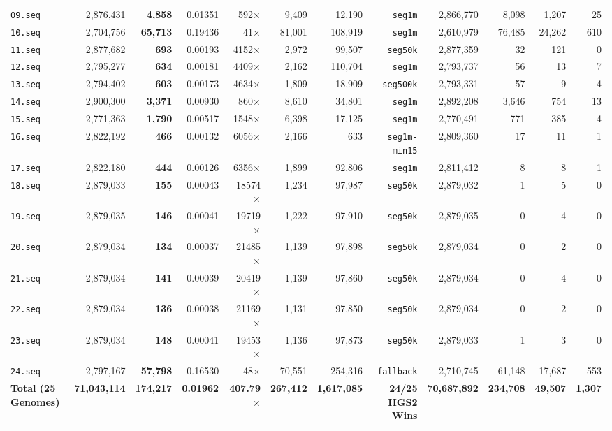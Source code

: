 \documentclass[10pt]{article}
\theoremstyle{definition}
\begin{document}
\begin{table}[h!]
{\begin{tabular}{lrrrrrrrrrrr}
\texttt{09.seq} & 2,876,431 & \textbf{4,858} & 0.01351 & 592$\times$ & 9,409 & 12,190 & \texttt{seg1m} & 2,866,770 & 8,098 & 1,207 & 25 \\
\texttt{10.seq} & 2,704,756 & \textbf{65,713} & 0.19436 & 41$\times$ & 81,001 & 108,919 & \texttt{seg1m} & 2,610,979 & 76,485 & 24,262 & 610 \\
\texttt{11.seq} & 2,877,682 & \textbf{693} & 0.00193 & 4152$\times$ & 2,972 & 99,507 & \texttt{seg50k} & 2,877,359 & 32 & 121 & 0 \\
\texttt{12.seq} & 2,795,277 & \textbf{634} & 0.00181 & 4409$\times$ & 2,162 & 110,704 & \texttt{seg1m} & 2,793,737 & 56 & 13 & 7 \\
\texttt{13.seq} & 2,794,402 & \textbf{603} & 0.00173 & 4634$\times$ & 1,809 & 18,909 & \texttt{seg500k} & 2,793,331 & 57 & 9 & 4 \\
\texttt{14.seq} & 2,900,300 & \textbf{3,371} & 0.00930 & 860$\times$ & 8,610 & 34,801 & \texttt{seg1m} & 2,892,208 & 3,646 & 754 & 13 \\
\texttt{15.seq} & 2,771,363 & \textbf{1,790} & 0.00517 & 1548$\times$ & 6,398 & 17,125 & \texttt{seg1m} & 2,770,491 & 771 & 385 & 4 \\
\texttt{16.seq} & 2,822,192 & \textbf{466} & 0.00132 & 6056$\times$ & 2,166 & 633 & \texttt{seg1m-min15} & 2,809,360 & 17 & 11 & 1 \\
\texttt{17.seq} & 2,822,180 & \textbf{444} & 0.00126 & 6356$\times$ & 1,899 & 92,806 & \texttt{seg1m} & 2,811,412 & 8 & 8 & 1 \\
\texttt{18.seq} & 2,879,033 & \textbf{155} & 0.00043 & 18574$\times$ & 1,234 & 97,987 & \texttt{seg50k} & 2,879,032 & 1 & 5 & 0 \\
\texttt{19.seq} & 2,879,035 & \textbf{146} & 0.00041 & 19719$\times$ & 1,222 & 97,910 & \texttt{seg50k} & 2,879,035 & 0 & 4 & 0 \\
\texttt{20.seq} & 2,879,034 & \textbf{134} & 0.00037 & 21485$\times$ & 1,139 & 97,898 & \texttt{seg50k} & 2,879,034 & 0 & 2 & 0 \\
\texttt{21.seq} & 2,879,034 & \textbf{141} & 0.00039 & 20419$\times$ & 1,139 & 97,860 & \texttt{seg50k} & 2,879,034 & 0 & 4 & 0 \\
\texttt{22.seq} & 2,879,034 & \textbf{136} & 0.00038 & 21169$\times$ & 1,131 & 97,850 & \texttt{seg50k} & 2,879,034 & 0 & 2 & 0 \\
\texttt{23.seq} & 2,879,034 & \textbf{148} & 0.00041 & 19453$\times$ & 1,136 & 97,873 & \texttt{seg50k} & 2,879,033 & 1 & 3 & 0 \\
\texttt{24.seq} & 2,797,167 & \textbf{57,798} & 0.16530 & 48$\times$ & 70,551 & 254,316 & \texttt{fallback} & 2,710,745 & 61,148 & 17,687 & 553 \\
\midrule
\textbf{Total (25 Genomes)} & \textbf{71,043,114} & \textbf{174,217} & \textbf{0.01962} & \textbf{407.79$\times$} & \textbf{267,412} & \textbf{1,617,085} & \textbf{24/25 HGS2 Wins} & \textbf{70,687,892} & \textbf{234,708} & \textbf{49,507} & \textbf{1,307} \\
\bottomrule
\end{tabular}%
}
\end{table}
\end{document}
